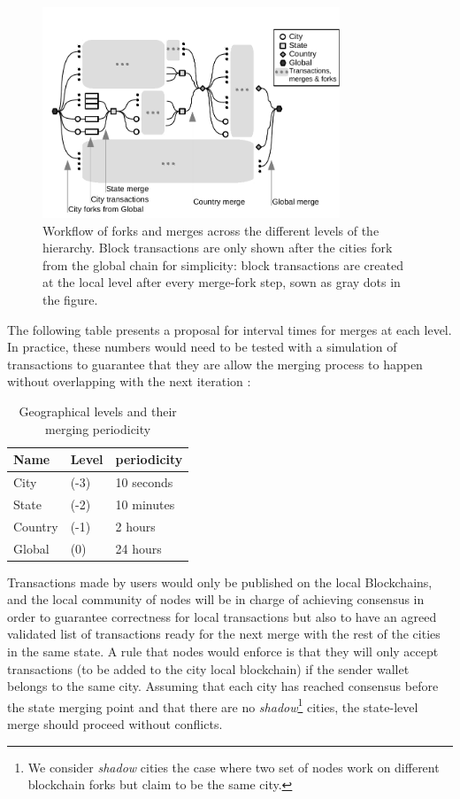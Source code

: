 \begin{figure}
\includegraphics[width=3.5in]{figure_fork_merge}
\caption{Workflow of forks and merges across the different levels of the
hierarchy.  Block transactions are only shown after the cities fork from the
global chain for simplicity: block transactions are created at the local level
after every merge-fork step, sown as gray dots in the figure.}
\label{fig:fork-merge}
\end{figure}

The following table presents a proposal for interval times for merges at each
level.  In practice, these numbers would need to be tested with a simulation of
transactions to guarantee that they are allow the merging process to happen
without overlapping with the next iteration :

\begin{table}
\centering
\begin{tabular}{l l l}
\textbf{Name} & \textbf{Level} & \textbf{periodicity}  \\
\midrule
City  &   (-3) & 10 seconds \\
State &   (-2) & 10 minutes \\
Country & (-1) & 2 hours \\
Global  & (0)  & 24 hours \\
\end{tabular}
\caption{Geographical levels and their merging periodicity}
\end{table}

Transactions made by users would only be published on the local Blockchains,
and the local community of nodes will be in charge of achieving consensus in
order to guarantee correctness for local transactions but also to have an
agreed validated list of transactions ready for the next merge with the rest of
the cities in the same state.  A rule that nodes would enforce is that they
will only accept transactions (to be added to the city local blockchain) if the
sender wallet belongs to the same city.  Assuming that each city has reached
consensus before the state merging point and that there are no
\textit{shadow}\footnote{We consider \textit{shadow} cities the case where two set of
nodes work on different blockchain forks but claim to be the same city.}
cities, the state-level merge should proceed without conflicts.

